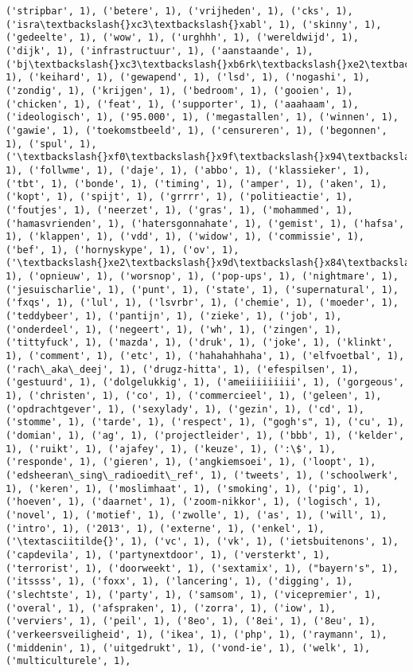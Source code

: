 \documentclass{article}
\begin{document}
\begin{Verbatim}[commandchars=\\\{\}]
('stripbar', 1), ('betere', 1), ('vrijheden', 1), ('cks', 1), ('isra\textbackslash{}xc3\textbackslash{}xabl', 1), ('skinny', 1), ('gedeelte', 1), ('wow', 1), ('urghhh', 1), ('wereldwijd', 1), ('dijk', 1), ('infrastructuur', 1), ('aanstaande', 1), ('bj\textbackslash{}xc3\textbackslash{}xb6rk\textbackslash{}xe2\textbackslash{}x80\textbackslash{}x99s', 1), ('keihard', 1), ('gewapend', 1), ('lsd', 1), ('nogashi', 1), ('zondig', 1), ('krijgen', 1), ('bedroom', 1), ('gooien', 1), ('chicken', 1), ('feat', 1), ('supporter', 1), ('aaahaam', 1), ('ideologisch', 1), ('95.000', 1), ('megastallen', 1), ('winnen', 1), ('gawie', 1), ('toekomstbeeld', 1), ('censureren', 1), ('begonnen', 1), ('spul', 1), ('\textbackslash{}xf0\textbackslash{}x9f\textbackslash{}x94\textbackslash{}xab', 1), ('follwme', 1), ('daje', 1), ('abbo', 1), ('klassieker', 1), ('tbt', 1), ('bonde', 1), ('timing', 1), ('amper', 1), ('aken', 1), ('kopt', 1), ('spijt', 1), ('grrrr', 1), ('politieactie', 1), ('foutjes', 1), ('neerzet', 1), ('gras', 1), ('mohammed', 1), ('hamasvrienden', 1), ('hatersgonnahate', 1), ('gemist', 1), ('hafsa', 1), ('klappen', 1), ('vdd', 1), ('widow', 1), ('commissie', 1), ('bef', 1), ('hornyskype', 1), ('ov', 1), ('\textbackslash{}xe2\textbackslash{}x9d\textbackslash{}x84\textbackslash{}xf0\textbackslash{}x9f\textbackslash{}x9a\textbackslash{}x97', 1), ('opnieuw', 1), ('worsnop', 1), ('pop-ups', 1), ('nightmare', 1), ('jesuischarlie', 1), ('punt', 1), ('state', 1), ('supernatural', 1), ('fxqs', 1), ('lul', 1), ('lsvrbr', 1), ('chemie', 1), ('moeder', 1), ('teddybeer', 1), ('pantijn', 1), ('zieke', 1), ('job', 1), ('onderdeel', 1), ('negeert', 1), ('wh', 1), ('zingen', 1), ('tittyfuck', 1), ('mazda', 1), ('druk', 1), ('joke', 1), ('klinkt', 1), ('comment', 1), ('etc', 1), ('hahahahhaha', 1), ('elfvoetbal', 1), ('rach\_aka\_deej', 1), ('drugz-hitta', 1), ('efespilsen', 1), ('gestuurd', 1), ('dolgelukkig', 1), ('ameiiiiiiiii', 1), ('gorgeous', 1), ('christen', 1), ('co', 1), ('commercieel', 1), ('geleen', 1), ('opdrachtgever', 1), ('sexylady', 1), ('gezin', 1), ('cd', 1), ('stomme', 1), ('tarde', 1), ('respect', 1), ("gogh's", 1), ('cu', 1), ('domian', 1), ('ag', 1), ('projectleider', 1), ('bbb', 1), ('kelder', 1), ('ruikt', 1), ('ajafey', 1), ('keuze', 1), (':\$', 1), ('responde', 1), ('gieren', 1), ('angkiemsoei', 1), ('loopt', 1), ('edsheeran\_sing\_radioedit\_ref', 1), ('tweets', 1), ('schoolwerk', 1), ('keren', 1), ('moslimhaat', 1), ('smoking', 1), ('pig', 1), ('hoeven', 1), ('daarnet', 1), ('zoom-nikkor', 1), ('logisch', 1), ('novel', 1), ('motief', 1), ('zwolle', 1), ('as', 1), ('will', 1), ('intro', 1), ('2013', 1), ('externe', 1), ('enkel', 1), ('\textasciitilde{}', 1), ('vc', 1), ('vk', 1), ('ietsbuitenons', 1), ('capdevila', 1), ('partynextdoor', 1), ('versterkt', 1), ('terrorist', 1), ('doorweekt', 1), ('sextamix', 1), ("bayern's", 1), ('itssss', 1), ('foxx', 1), ('lancering', 1), ('digging', 1), ('slechtste', 1), ('party', 1), ('samsom', 1), ('vicepremier', 1), ('overal', 1), ('afspraken', 1), ('zorra', 1), ('iow', 1), ('verviers', 1), ('peil', 1), ('8eo', 1), ('8ei', 1), ('8eu', 1), ('verkeersveiligheid', 1), ('ikea', 1), ('php', 1), ('raymann', 1), ('middenin', 1), ('uitgedrukt', 1), ('vond-ie', 1), ('welk', 1), ('multiculturele', 1), 
\end{Verbatim}
\end{document}
